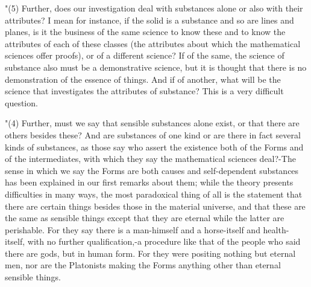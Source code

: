 "(5) Further, does our investigation deal with substances alone or
also with their attributes? I mean for instance, if the solid is a
substance and so are lines and planes, is it the business of the same
science to know these and to know the attributes of each of these
classes (the attributes about which the mathematical sciences offer
proofs), or of a different science? If of the same, the science of
substance also must be a demonstrative science, but it is thought
that there is no demonstration of the essence of things. And if of
another, what will be the science that investigates the attributes
of substance? This is a very difficult question. 

"(4) Further, must we say that sensible substances alone exist, or
that there are others besides these? And are substances of one kind
or are there in fact several kinds of substances, as those say who
assert the existence both of the Forms and of the intermediates, with
which they say the mathematical sciences deal?-The sense in which
we say the Forms are both causes and self-dependent substances has
been explained in our first remarks about them; while the theory presents
difficulties in many ways, the most paradoxical thing of all is the
statement that there are certain things besides those in the material
universe, and that these are the same as sensible things except that
they are eternal while the latter are perishable. For they say there
is a man-himself and a horse-itself and health-itself, with no further
qualification,-a procedure like that of the people who said there
are gods, but in human form. For they were positing nothing but eternal
men, nor are the Platonists making the Forms anything other than eternal
sensible things. 

